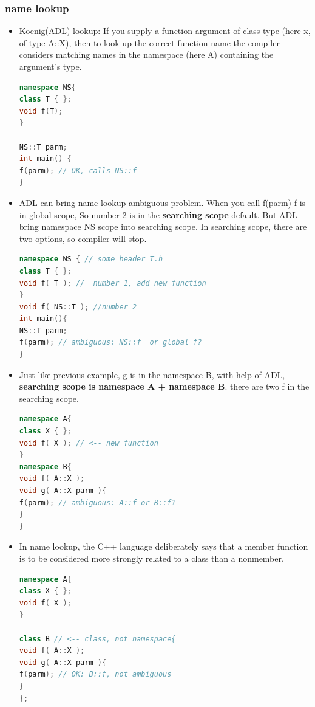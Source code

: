 \documentclass[a4paper,12pt,twoside]{book}
\begin{document}
\subsubsection{name lookup}
\begin{itemize}

\item Koenig(ADL) lookup: If you supply a function argument of class type (here x, of type A::X), then to look up the correct function name the compiler considers matching names in the namespace (here A) containing the argument's type.
\begin{lstlisting}[frame=single, language=c++]
namespace NS{
class T { };
void f(T);
}

NS::T parm;
int main() {
f(parm); // OK, calls NS::f
}
\end{lstlisting}


\item ADL can bring name lookup ambiguous problem.  When you call f(parm) f is in global scope, So number 2 is in the \textbf{searching scope} default. But ADL bring namespace NS scope into searching scope. In searching scope, there are two options, so compiler will stop.
\begin{lstlisting}[frame=single, language=c++]
namespace NS { // some header T.h
class T { };
void f( T ); //  number 1, add new function
}
void f( NS::T ); //number 2
int main(){
NS::T parm;
f(parm); // ambiguous: NS::f  or global f?
}
\end{lstlisting}

\item Just like previous example, g is in the namespace B, with help of ADL, \textbf{searching scope is namespace A + namespace B}. there are two f in the searching scope.

\begin{lstlisting}[frame=single, language=c++]
namespace A{
class X { };
void f( X ); // <-- new function
}
namespace B{
void f( A::X );
void g( A::X parm ){
f(parm); // ambiguous: A::f or B::f?
}
}
\end{lstlisting}

\item In name lookup, the C++ language deliberately says that a member function is to be considered more strongly related to a class than a nonmember.
\begin{lstlisting}[frame=single, language=c++]
namespace A{
class X { };
void f( X );
}

class B // <-- class, not namespace{
void f( A::X );
void g( A::X parm ){
f(parm); // OK: B::f, not ambiguous
}
};
\end{lstlisting}


\end{itemize}
\end{document}
